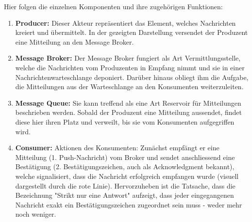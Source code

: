 Hier folgen die einzelnen Komponenten und ihre zugehörigen Funktionen:
\begin{enumerate}
    \item \textbf{Producer:} Dieser Akteur repräsentiert das Element, welches Nachrichten kreiert und übermittelt. In der gezeigten Darstellung versendet der Produzent eine Mitteilung an den Message Broker.
    \item \textbf{Message Broker:} Der Message Broker fungiert als Art Vermittlungsstelle, welche die Nachrichten vom Produzenten in Empfang nimmt und sie in einer Nachrichtenwarteschlange deponiert. Darüber hinaus obliegt ihm die Aufgabe, die Mitteilungen aus der Warteschlange an den Konsumenten weiterzuleiten.
    \item \textbf{Message Queue:} Sie kann treffend als eine Art Reservoir für Mitteilungen beschrieben werden. Sobald der Produzent eine Mitteilung aussendet, findet diese hier ihren Platz und verweilt, bis sie vom Konsumenten aufgegriffen wird.
    \item \textbf{Consumer:} Aktionen des Konsumenten: Zunächst empfängt er eine Mitteilung (1. Push-Nachricht) vom Broker und sendet anschliessend eine Bestätigung (2. Bestätigungszeichen, auch als Acknowledgment bekannt), welche signalisiert, dass die Nachricht erfolgreich empfangen wurde (visuell dargestellt durch die rote Linie). Hervorzuheben ist die Tatsache, dass die Bezeichnung "Strikt nur eine Antwort" aufzeigt, dass jeder eingegangenen Nachricht exakt ein Bestätigungszeichen zugeordnet sein muss - weder mehr noch weniger.
\end{enumerate}